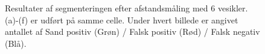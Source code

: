 \begin{figure}[H]
  \hspace{0.1cm}
  \hspace{0.1cm}
  \caption{Resultater af segmenteringen efter afstandsmåling med 6 vesikler. (a)-(f) er udført på samme celle. Under hvert billede er angivet antallet af Sand positiv (Grøn) / Falsk positiv (Rød) / Falsk negativ (Blå).}
  \label{fig:animalssssssssssss}
\end{figure}
